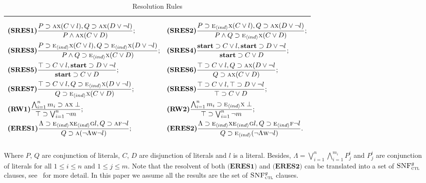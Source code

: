 \documentclass[letterpaper]{article} %
\begin{document}
\begin{table*}[h]
\centering
\footnotesize
    \begin{tabular}{l}
    \hline
    $$
\begin{aligned}
& \textbf{(SRES1)}\frac{P\supset \textsc{a}\textsc{x}(C\vee l), Q\supset \textsc{a}\textsc{x}(D\vee \neg l)}{P\wedge \textsc{a}\textsc{x}(C\vee D)}; &&
    \textbf{(SRES2)} \frac{P\supset \textsc{e}_{{\langle{ind}\rangle}} \textsc{x}(C\vee l), Q\supset \textsc{a}\textsc{x}(D\vee \neg l)}{P\wedge Q \supset \textsc{e}_{{\langle{ind}\rangle}}\textsc{x}(C\vee D)};\\
& \textbf{(SRES3)} \frac{P\supset \textsc{e}_{{\langle{ind}\rangle}}\textsc{x}(C\vee l), Q \supset \textsc{e}_{{\langle{ind}\rangle}}\textsc{x}(D\vee \neg l)}{P\wedge Q\supset\textsc{e}_{{\langle{ind}\rangle}}\textsc{x}(C\vee D)};  &&
    \textbf{(SRES4)} \frac{\textbf{start} \supset C\vee l, \textbf{start} \supset D \vee \neg l}{\textbf{start} \supset C\vee D}; \\
& \textbf{(SRES5)} \frac{\top \supset C\vee l, \textbf{start} \supset D \vee \neg l}{\textbf{start} \supset C \vee D}; &&
  \textbf{(SRES6)} \frac{\top \supset C \vee l, Q \supset \textsc{a}\textsc{x}(D \vee \neg l}{Q\supset \textsc{a} \textsc{x}(C\vee D)}; \\
& \textbf{(SRES7)} \frac{\top \supset C \vee l, Q \supset \textsc{e}_{{\langle{ind}\rangle}} \textsc{x}(D \vee \neg l)}{Q\supset \textsc{e}_{{\langle{ind}\rangle}}\textsc{x}(C\vee D)}; &&
  \textbf{(SRES8)} \frac{\top \supset C\vee l, \top \supset D \vee \neg l}{\top \supset C \vee D};\\
& \textbf{(RW1)} \frac{\bigwedge_{i=1}^n m_i \supset \textsc{a}\textsc{x} \perp}{\top \supset \bigvee_{i=1}^n \neg m};  && \textbf{(RW2)} \frac{\bigwedge_{i=1}^n m_i \supset \textsc{e}_{{\langle{ind}\rangle}}\textsc{x} \perp}{\top \supset \bigvee_{i=1}^n \neg m}; \\
&\textbf{(ERES1)} \frac{\Lambda \supset \textsc{e}_{{\langle{ind}\rangle}} \textsc{x} \textsc{e}_{{\langle{ind}\rangle}}\textsc{g} l, Q \supset \textsc{a} \textsc{f} \neg l}{Q \supset \textsc{a}(\neg \Lambda \textsc{w} \neg l)};  &&  \textbf{(ERES2)} \frac{\Lambda \supset \textsc{e}_{{\langle{ind}\rangle}} \textsc{x} \textsc{e}_{{\langle{ind}\rangle}}\textsc{g} l, Q \supset \textsc{e}_{{\langle{ind}\rangle}} \textsc{f} \neg l}{Q \supset \textsc{e}_{{\langle{ind}\rangle}}(\neg \Lambda \textsc{w} \neg l)}.
\end{aligned}
$$\\
\hline
 \end{tabular}
    \caption{Resolution Rules}
    Where $P$, $Q$ are conjunction of literals, $C$, $D$ are disjunction of literals and $l$ is a literal. Besides, $\Lambda=\bigvee_{i=1}^n \bigwedge_{i=1}^{m_i}P_j^i$ and $P_j^i$ are conjunction of literals for all $1\leq i\leq n$ and $1\leq j\leq m$. Note that the resolvent of both $\textbf{(ERES1)}$ and $\textbf{(ERES2)}$ can be translated into a set of ${\textsc{SNF}_{\textsc{ctl}}^g}$ clauses, see~\cite{zhang2014resolution} for more detail. In this paper we assume all the results are the set of ${\textsc{SNF}_{\textsc{ctl}}^g}$ clauses.
    \label{tab:res}
\end{table*}
\end{document}
